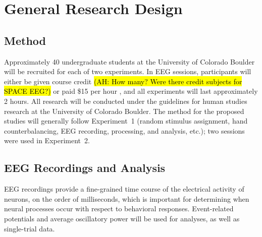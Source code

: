 
\section{General Research Design}

\subsection{Method}



Approximately 40 undergraduate students at the University of Colorado Boulder will be recruited for each of two experiments.  In EEG sessions, participants will either be given course credit \hl{(AH: How many? Were there credit subjects for SPACE EEG?)} or paid \$15 per hour , and all experiments will last approximately 2 hours.  All research will be conducted under the guidelines for human studies research at the University of Colorado Boulder.  The method for the proposed studies will generally follow Experiment~1 (random stimulus assignment, hand counterbalancing, EEG recording, processing, and analysis, etc.); two sessions were used in Experiment~2.


\subsection{EEG Recordings and Analysis}

EEG recordings provide a fine-grained time course of the electrical
activity of neurons, on the order of milliseconds, which is important
for determining when neural processes occur with respect to behavioral
responses.  Event-related potentials and average oscillatory power will be used for analyses, as well as single-trial data.


